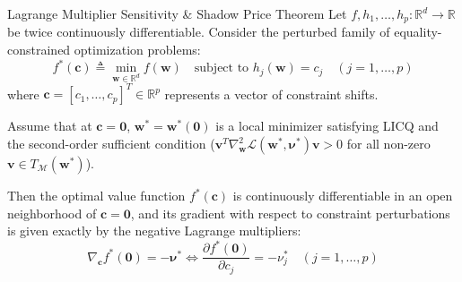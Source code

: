 \begin{theorembox}{Lagrange Multiplier Sensitivity \& Shadow Price Theorem}
Let $f, h_1, \dots, h_p: \mathbb{R}^d \to \mathbb{R}$ be twice continuously differentiable. Consider the perturbed family of equality-constrained optimization problems:
\begin{equation}
f^*(\mathbf{c}) \triangleq \min_{\mathbf{w} \in \mathbb{R}^d} f(\mathbf{w}) \quad \text{subject to } h_j(\mathbf{w}) = c_j \quad (j = 1, \dots, p)
\label{eq:perturbed_opt_prob}
\end{equation}
where $\mathbf{c} = [c_1, \dots, c_p]^T \in \mathbb{R}^p$ represents a vector of constraint shifts.

Assume that at $\mathbf{c} = \mathbf{0}$, $\mathbf{w}^* = \mathbf{w}^*(\mathbf{0})$ is a local minimizer satisfying LICQ and the second-order sufficient condition ($\mathbf{v}^T \nabla_{\mathbf{w}}^2 \mathcal{L}(\mathbf{w}^*, \boldsymbol{\nu}^*) \mathbf{v} > 0$ for all non-zero $\mathbf{v} \in T_{\mathcal{M}}(\mathbf{w}^*)$).

Then the optimal value function $f^*(\mathbf{c})$ is continuously differentiable in an open neighborhood of $\mathbf{c} = \mathbf{0}$, and its gradient with respect to constraint perturbations is given exactly by the negative Lagrange multipliers:
\begin{equation}
\nabla_{\mathbf{c}} f^*(\mathbf{0}) = -\boldsymbol{\nu}^* \iff \frac{\partial f^*(\mathbf{0})}{\partial c_j} = -\nu_j^* \quad (j = 1, \dots, p)
\label{eq:lagrange_sensitivity_grad}
\end{equation}
\end{theorembox}

